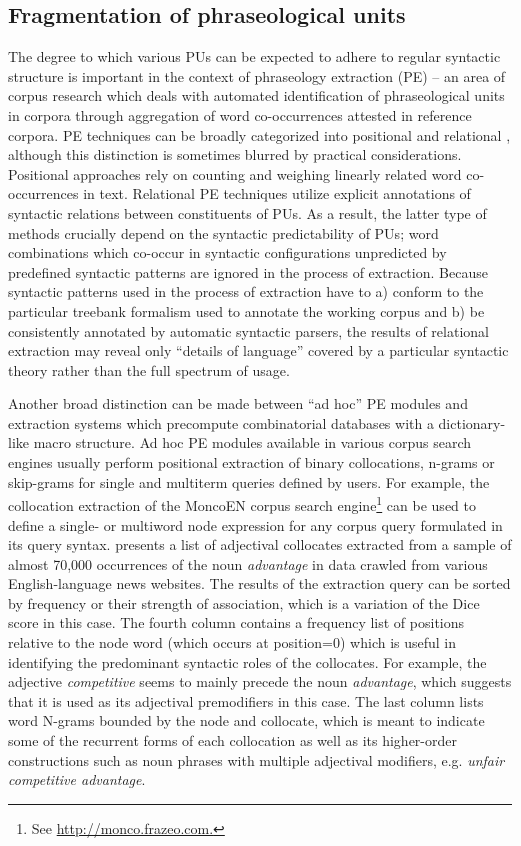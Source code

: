 \documentclass[output=paper]{langscibook}
\begin{document}
\subsection{Fragmentation of phraseological units}

The degree to which various PUs can be expected to adhere to regular syntactic structure is important in the context of phraseology extraction (PE) -- an area of corpus research which deals with automated identification of phraseological units in corpora through aggregation of word co-occurrences attested in reference corpora. PE techniques can be broadly categorized into positional and relational \citep{Evert2005}, although this distinction is sometimes blurred by practical considerations. Positional approaches rely on counting and weighing linearly related word co-occurrences in text. Relational PE techniques utilize explicit annotations of syntactic relations between constituents of PUs. As a result, the latter type of methods crucially depend on the syntactic predictability of PUs; word combinations which co-occur in syntactic configurations unpredicted by predefined syntactic patterns are ignored in the process of extraction. Because syntactic patterns used in the process of extraction have to a) conform to the particular treebank formalism used to annotate the working corpus and b) be consistently annotated by automatic syntactic parsers, the results of relational extraction may reveal only “details of language” covered by a particular syntactic theory \citep[4]{Sinclair1991} rather than the full spectrum of usage.

Another broad distinction can be made between ``ad hoc'' PE modules and extraction systems which precompute combinatorial databases with a dictionary-like macro structure. Ad hoc PE modules available in various corpus search engines usually perform positional extraction of binary collocations, n-grams or skip-grams for single and multiterm queries defined by users. For example, the collocation extraction of the MoncoEN corpus search engine\footnote{See \url{http://monco.frazeo.com.}} can be used to define a single- or multiword node expression for any corpus query formulated in its query syntax.  presents a list of adjectival collocates extracted from a sample of almost 70,000 occurrences of the noun \textit{advantage} in data crawled from various English-language news websites. The results of the extraction query can be sorted by frequency or their strength of association, which is a variation of the Dice score in this case. The fourth column contains a frequency list of positions relative to the node word (which occurs at position=0) which is useful in identifying the predominant syntactic roles of the collocates. For example, the adjective \textit{competitive} seems to mainly precede the noun \textit{advantage}, which suggests that it is used as its adjectival premodifiers in this case. The last column lists word N-grams bounded by the node and collocate, which is meant to indicate some of the recurrent forms of each collocation as well as its higher-order constructions such as noun phrases with multiple adjectival modifiers, e.g. \textit{unfair competitive advantage}.
\end{document}
